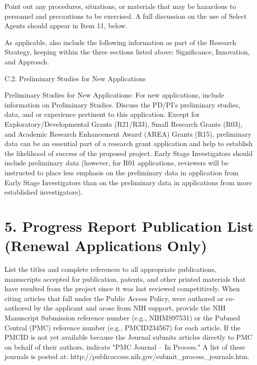 \documentclass[11pt,notitlepage]{article}
\begin{document}
Point out any procedures, situations, or materials that may be hazardous to personnel and precautions to be exercised. A full discussion on the use of Select Agents should appear in Item 11, below.

As applicable, also include the following information as part of the Research Strategy, keeping within the three sections listed above: Significance, Innovation, and Approach.

\begin{description}
\item[C.2. Preliminary Studies for New Applications]{}
\end{description}

Preliminary Studies for New Applications: For new applications, include information on Preliminary Studies. Discuss the PD/PI's preliminary studies, data, and or experience pertinent to this application. Except for Exploratory/Developmental Grants (R21/R33), Small Research Grants (R03), and Academic Research Enhancement Award (AREA) Grants (R15), preliminary data can be an essential part of a research grant application and help to establish the likelihood of success of the proposed project. Early Stage Investigators should include preliminary data (however, for R01 applications, reviewers will be instructed to place less emphasis on the preliminary data in application from Early Stage Investigators than on the preliminary data in applications from more established investigators).


\newpage

\section*{5. Progress Report Publication List (Renewal Applications Only)}

List the titles and complete references to all appropriate publications, manuscripts accepted for publication, patents, and other printed materials that have resulted from the project since it was last reviewed competitively. When citing articles that fall under the Public Access Policy, were authored or co-authored by the applicant and arose from NIH support, provide the NIH Manuscript Submission reference number (e.g., NIHMS97531) or the Pubmed Central (PMC) reference number (e.g., PMCID234567) for each article. If the PMCID is not yet available because the Journal submits articles directly to PMC on behalf of their authors, indicate "PMC Journal -- In Process." A list of these journals is posted at: http://publicaccess.nih.gov/submit\_process\_journals.htm.
\end{document}
